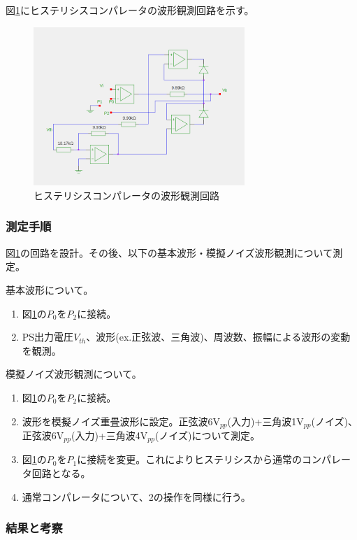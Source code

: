 \documentclass[11pt,a4j]{jsarticle}
\begin{document}
    図\ref{fig:histeri_wave}にヒステリシスコンパレータの波形観測回路を示す。
    
    \begin{figure}[htbp]
  \centering
  \includegraphics[width=8cm,clip]{histeri_wave.png}
  \caption{ヒステリシスコンパレータの波形観測回路}
  \label{fig:histeri_wave}
 \end{figure}%
    
   \subsubsection{測定手順}
    
    図\ref{fig:histeri_wave}の回路を設計。その後、以下の基本波形・模擬ノイズ波形観測について測定。
    
    基本波形について。
    \begin{enumerate}
    \item 図\ref{fig:histeri_wave}の$P_0$を$P_2$に接続。
    \item PS出力電圧$V_{th}$、波形(ex.正弦波、三角波)、周波数、振幅による波形の変動を観測。
    \end{enumerate}
    
    模擬ノイズ波形観測について。
    \begin{enumerate}
    \item 図\ref{fig:histeri_wave}の$P_0$を$P_2$に接続。
    \item 波形を模擬ノイズ重畳波形に設定。正弦波6V$_{pp}$(入力)+三角波1V$_{pp}$(ノイズ)、正弦波6V$_{pp}$(入力)+三角波4V$_{pp}$(ノイズ)について測定。
    \item 図\ref{fig:histeri_wave}の$P_0$を$P_1$に接続を変更。これによりヒステリシスから通常のコンパレータ回路となる。
    \item 通常コンパレータについて、2の操作を同様に行う。
    \end{enumerate}
    
   \subsubsection{結果と考察}
    
\end{document}
